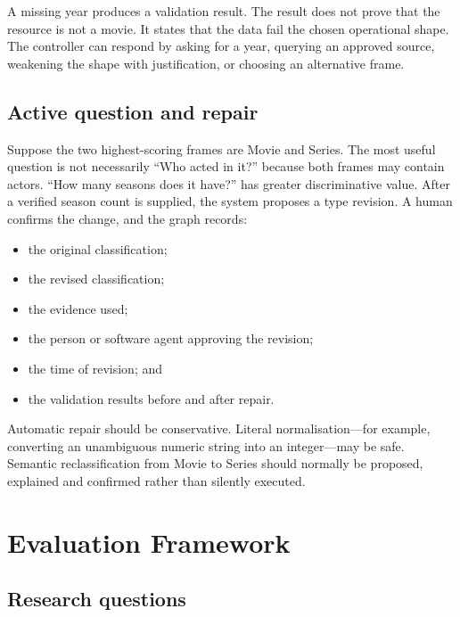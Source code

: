 \documentclass[11pt,a4paper]{article}
\begin{document}
A missing year produces a validation result. The result does not prove that the
resource is not a movie. It states that the data fail the chosen operational
shape. The controller can respond by asking for a year, querying an approved
source, weakening the shape with justification, or choosing an alternative
frame.

\subsection{Active question and repair}

Suppose the two highest-scoring frames are Movie and Series. The most useful
question is not necessarily ``Who acted in it?'' because both frames may contain
actors. ``How many seasons does it have?'' has greater discriminative value.
After a verified season count is supplied, the system proposes a type revision.
A human confirms the change, and the graph records:

\begin{itemize}
  \item the original classification;
  \item the revised classification;
  \item the evidence used;
  \item the person or software agent approving the revision;
  \item the time of revision; and
  \item the validation results before and after repair.
\end{itemize}

\begin{criticalbox}
Automatic repair should be conservative. Literal normalisation---for example,
converting an unambiguous numeric string into an integer---may be safe. Semantic
reclassification from Movie to Series should normally be proposed, explained
and confirmed rather than silently executed.
\end{criticalbox}

\section{Evaluation Framework}

\subsection{Research questions}
\end{document}
